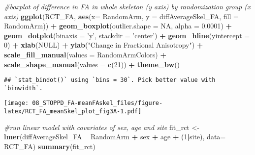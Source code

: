 \documentclass[]{article}
\newenvironment{Shaded}{\begin{snugshade}}{\end{snugshade}}
\newcommand{\KeywordTok}[1]{\textcolor[rgb]{0.13,0.29,0.53}{\textbf{#1}}}
\newcommand{\DataTypeTok}[1]{\textcolor[rgb]{0.13,0.29,0.53}{#1}}
\newcommand{\DecValTok}[1]{\textcolor[rgb]{0.00,0.00,0.81}{#1}}
\newcommand{\FloatTok}[1]{\textcolor[rgb]{0.00,0.00,0.81}{#1}}
\newcommand{\StringTok}[1]{\textcolor[rgb]{0.31,0.60,0.02}{#1}}
\newcommand{\CommentTok}[1]{\textcolor[rgb]{0.56,0.35,0.01}{\textit{#1}}}
\newcommand{\OtherTok}[1]{\textcolor[rgb]{0.56,0.35,0.01}{#1}}
\newcommand{\OperatorTok}[1]{\textcolor[rgb]{0.81,0.36,0.00}{\textbf{#1}}}
\newcommand{\NormalTok}[1]{#1}
\theoremstyle{definition}
\theoremstyle{definition}
\theoremstyle{definition}
\theoremstyle{remark}
\begin{document}
\begin{Shaded}
\begin{Highlighting}[]
\CommentTok{#boxplot of difference in FA in whole skeleton (y axis) by randomization group (x axis)}
\KeywordTok{ggplot}\NormalTok{(RCT_FA, }\KeywordTok{aes}\NormalTok{(}\DataTypeTok{x=}\NormalTok{ RandomArm, }\DataTypeTok{y =}\NormalTok{ diffAverageSkel_FA, }\DataTypeTok{fill =}\NormalTok{ RandomArm)) }\OperatorTok{+}\StringTok{ }
\StringTok{   }\KeywordTok{geom_boxplot}\NormalTok{(}\DataTypeTok{outlier.shape =} \OtherTok{NA}\NormalTok{, }\DataTypeTok{alpha =} \FloatTok{0.0001}\NormalTok{) }\OperatorTok{+}\StringTok{ }
\StringTok{   }\KeywordTok{geom_dotplot}\NormalTok{(}\DataTypeTok{binaxis =} \StringTok{'y'}\NormalTok{, }\DataTypeTok{stackdir =} \StringTok{'center'}\NormalTok{) }\OperatorTok{+}
\StringTok{   }\KeywordTok{geom_hline}\NormalTok{(}\DataTypeTok{yintercept =} \DecValTok{0}\NormalTok{) }\OperatorTok{+}
\StringTok{   }\KeywordTok{xlab}\NormalTok{(}\OtherTok{NULL}\NormalTok{) }\OperatorTok{+}\StringTok{  }
\StringTok{   }\KeywordTok{ylab}\NormalTok{(}\StringTok{"Change in Fractional Anisotropy"}\NormalTok{) }\OperatorTok{+}
\StringTok{   }\KeywordTok{scale_fill_manual}\NormalTok{(}\DataTypeTok{values =}\NormalTok{ RandomArmColors) }\OperatorTok{+}
\StringTok{   }\KeywordTok{scale_shape_manual}\NormalTok{(}\DataTypeTok{values =} \KeywordTok{c}\NormalTok{(}\DecValTok{21}\NormalTok{)) }\OperatorTok{+}
\StringTok{   }\KeywordTok{theme_bw}\NormalTok{()}
\end{Highlighting}
\end{Shaded}

\begin{verbatim}
## `stat_bindot()` using `bins = 30`. Pick better value with `binwidth`.
\end{verbatim}

\texttt{[image: 08\_STOPPD\_FA-meanFAskel\_files/figure-latex/RCT\_FA\_meanSkel\_plot\_fig3A-1.pdf]}

\begin{Shaded}
\begin{Highlighting}[]
\CommentTok{#run linear model with covariates of sex, age and site}
\NormalTok{fit_rct <-}\StringTok{ }\KeywordTok{lmer}\NormalTok{(diffAverageSkel_FA }\OperatorTok{~}\StringTok{ }\NormalTok{RandomArm }\OperatorTok{+}\StringTok{ }\NormalTok{sex }\OperatorTok{+}\StringTok{ }\NormalTok{age }\OperatorTok{+}\StringTok{ }\NormalTok{(}\DecValTok{1}\OperatorTok{|}\NormalTok{site), }\DataTypeTok{data=}\NormalTok{ RCT_FA)}
\KeywordTok{summary}\NormalTok{(fit_rct)}
\end{Highlighting}
\end{Shaded}
\end{document}
